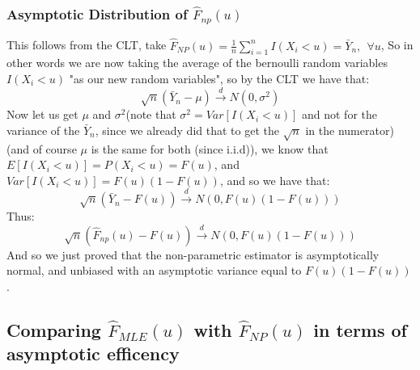 \documentclass[12pt]{article}
\begin{document}
\subsubsection*{Asymptotic Distribution of $\hat{F}_{np}(u)$}
This follows from the CLT, take $\hat{F}_{NP}(u) = \frac{1}{n}\sum_{i=1}^{n}I(X_i<u)=\bar{Y}_n, \ \ \forall u$, So in other words we are now taking the average of the bernoulli random variables $I(X_i<u)$ "as our new random variables", so by the CLT we have that:
\[
\sqrt{n}(\bar{Y}_n - \mu) \xrightarrow{d} N(0,\sigma^2)
\]  
Now let us get $\mu$ and $\sigma^2$(note that $\sigma^2 = Var[I(X_i<u)]$ and not for the variance of the $\bar{Y}_n$, since we already did that to get the $\sqrt{n}$ in the numerator) (and of course $\mu$ is the same for both (since i.i.d)), we know that $E[I(X_i<u)] = P(X_i<u) = F(u)$, and $Var[I(X_i<u)] = F(u)(1-F(u))$, and so we have that: 
\[
\sqrt{n}(\bar{Y}_n - F(u)) \xrightarrow{d} N(0,F(u)(1-F(u)))
\]
Thus: 
\[
\sqrt{n}(\hat{F}_{np}(u) - F(u)) \xrightarrow{d} N(0,F(u)(1-F(u)))
\]
And so we just proved that the non-parametric estimator is asymptotically normal, and unbiased with an asymptotic variance equal to $F(u)(1-F(u))$.
\subsection*{Comparing $\hat{F}_{MLE}(u)$ with $\hat{F}_{NP}(u)$ in terms of asymptotic efficency}
\end{document}
